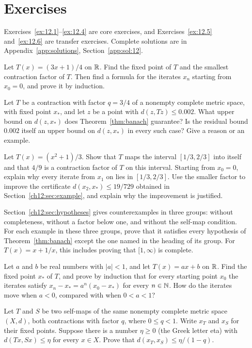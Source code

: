 \section*{Exercises}
Exercises~\ref{ex:12.1}--\ref{ex:12.4} are core exercises, and Exercises~\ref{ex:12.5} and~\ref{ex:12.6} are transfer exercises. Complete solutions are in Appendix~\ref{app:solutions}, Section~\ref{app:sol:12}.
\begin{exercise}\label{ex:12.1}Let $T(x)=(3x+1)/4$ on $\mathbb R$. Find the fixed point of $T$ and the smallest contraction factor of $T$. Then find a formula for the iterates $x_n$ starting from $x_0=0$, and prove it by induction.\end{exercise}
\begin{exercise}\label{ex:12.2}Let $T$ be a contraction with factor $q=3/4$ of a nonempty complete metric space, with fixed point $x_*$, and let $z$ be a point with $d(z,Tz)\le0.002$. What upper bound on $d(z,x_*)$ does Theorem~\ref{thm:banach} guarantee? Is the residual bound $0.002$ itself an upper bound on $d(z,x_*)$ in every such case? Give a reason or an example.\end{exercise}
\begin{exercise}\label{ex:12.3}Let $T(x)=(x^2+1)/3$. Show that $T$ maps the interval $[1/3,2/3]$ into itself and that $4/9$ is a contraction factor of $T$ on this interval. Starting from $x_0=0$, explain why every iterate from $x_1$ on lies in $[1/3,2/3]$. Use the smaller factor to improve the certificate $d(x_2,x_*)\le19/729$ obtained in Section~\ref{ch12:sec:example}, and explain why the improvement is justified.\end{exercise}
\begin{exercise}\label{ex:12.4}Section~\ref{ch12:sec:hypotheses} gives counterexamples in three groups: without completeness, without a factor below one, and without the self-map condition. For each example in these three groups, prove that it satisfies every hypothesis of Theorem~\ref{thm:banach} except the one named in the heading of its group. For $T(x)=x+1/x$, this includes proving that $[1,\infty)$ is complete.\end{exercise}
\begin{exercise}\label{ex:12.5}Let $a$ and $b$ be real numbers with $|a|<1$, and let $T(x)=ax+b$ on $\mathbb R$. Find the fixed point $x_*$ of $T$, and prove by induction that for every starting point $x_0$ the iterates satisfy $x_n-x_*=a^n(x_0-x_*)$ for every $n\in\mathbb N$. How do the iterates move when $a<0$, compared with when $0<a<1$?\end{exercise}
\begin{exercise}\label{ex:12.6}Let $T$ and $S$ be two self-maps of the same nonempty complete metric space $(X,d)$, both contractions with factor $q$, where $0\le q<1$. Write $x_T$ and $x_S$ for their fixed points. Suppose there is a number $\eta\ge0$ (the Greek letter eta) with $d(Tx,Sx)\le\eta$ for every $x\in X$. Prove that $d(x_T,x_S)\le\eta/(1-q)$.\end{exercise}
